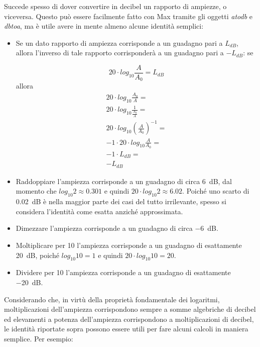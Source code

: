\documentclass[11pt]{report}
\begin{document}
Succede spesso di dover convertire in decibel un rapporto di ampiezze, o viceversa. Questo può essere facilmente fatto con Max tramite gli oggetti \emph{atodb} e \emph{dbtoa}, ma è utile avere in mente almeno alcune identità semplici:

\begin{itemize}

\item Se un dato rapporto di ampiezza corrisponde a un guadagno pari a $L_{dB}$, allora l'inverso di tale rapporto corrisponderà a un guadagno pari a $-L_{dB}$: se

\begin{equation}
20 \cdot log_{10} \frac{A}{A_0} = L_{dB}
\end{equation}
allora
\begin{equation}
\begin{aligned}
20 \cdot log_{10} \frac{A_0}{A} =\\
20 \cdot log_{10} \frac{1}{\frac{A_0}{A}} =\\
20 \cdot log_{10} (\frac{A}{A_0})^{-1} =\\
-1 \cdot 20 \cdot log_{10} \frac{A}{A_0} =\\
-1 \cdot L_{dB} =\\
-L_{dB}
\end{aligned}
\end{equation}

\item Raddoppiare l'ampiezza corrisponde a un guadagno di circa \qty{6}{dB}, dal momento che $log_{10} 2 \approx 0.301$ e quindi $20 \cdot log_{10} 2 \approx 6.02$. Poiché uno scarto di \qty{0.02}{dB} è nella maggior parte dei casi del tutto irrilevante, spesso si considera l'identità come esatta anziché approssimata.

\item Dimezzare l'ampiezza corrisponde a un guadagno di circa \qty{-6}{dB}.

\item Moltiplicare per 10 l'ampiezza corrisponde a un guadagno di esattamente \qty{20}{dB}, poiché $log_{10} 10 = 1$ e quindi $20 \cdot log_{10} 10 = 20$.

\item Dividere per 10 l'ampiezza corrisponde a un guadagno di esattamente \qty{-20}{dB}.

\end{itemize}

Considerando che, in virtù della proprietà fondamentale dei logaritmi, moltiplicazioni dell'ampiezza corrispondono sempre a somme algebriche di decibel ed elevamenti a potenza dell'ampiezza corrispondono a moltiplicazioni di decibel, le identità riportate sopra possono essere utili per fare alcuni calcoli in maniera semplice. Per esempio:
\end{document}
